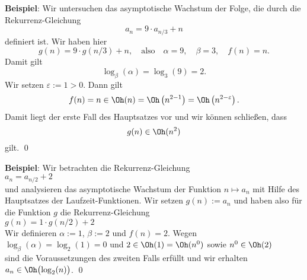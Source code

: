 \noindent
\textbf{Beispiel}:
Wir untersuchen das asymptotische Wachstum der Folge, die durch die Rekurrenz-Gleichung
\[ a_n = 9 \cdot a_{n/3} + n \]
definiert ist.  Wir haben hier 
\[ g(n) = 9 \cdot g(n/3) + n, \quad \mbox{also} \quad \alpha = 9, 
   \quad \beta = 3, \quad f(n) = n.
\]
Damit gilt 
\[ \log_\beta(\alpha) = \log_3(9) = 2. \]
Wir setzen $\varepsilon := 1 > 0$.  Dann gilt
\[ f(n) = n \in \Oh(n) = \Oh\left(n^{2-1}\right) = \Oh\left(n^{2-\varepsilon}\right). \]
Damit liegt der erste Fall des Hauptsatzes vor und wir k\"onnen schlie{\ss}en, dass
\[ g(n) \in \Oh(n^2) \]
gilt. \qed
\vspace*{0.3cm}

\noindent
\textbf{Beispiel}:
Wir  betrachten die Rekurrenz-Gleichung 
\\[0.2cm]
\hspace*{1.3cm}
$a_n = a_{n/2} + 2$
\\[0.2cm]
und analysieren das asymptotische Wachstum der Funktion $n \mapsto a_n$ mit Hilfe des
Hauptsatzes der Laufzeit-Funktionen.
Wir setzen $g(n) := a_n$ und haben also f\"ur die Funktion $g$ die Rekurrenz-Gleichung
\\[0.2cm]
\hspace*{1.3cm}
$g(n) = 1 \cdot g\left(n/2\right) + 2$
\\[0.2cm]
Wir definieren $\alpha := 1$, $\beta := 2$ und $f(n) = 2$.  Wegen 
\\[0.2cm]
\hspace*{1.3cm}
$\log_\beta(\alpha) = \log_2(1) = 0$ \quad und \quad
$2 \in \Oh(1)= \Oh(n^0)$ \quad sowie \quad $n^0 \in \Oh(2)$
\\[0.2cm]
sind die Voraussetzungen des zweiten Falls erf\"ullt und wir erhalten 
\\[0.2cm]
\hspace*{1.3cm}
$a_n \in \Oh\bigl(\log_2(n)\bigr)$.
\qed
\vspace*{0.3cm}

